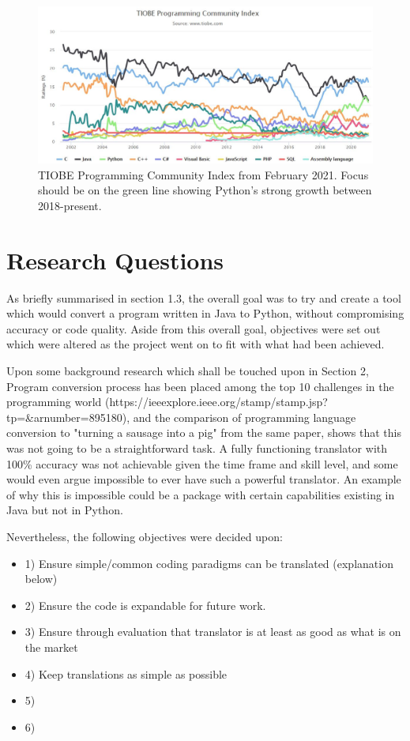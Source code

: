 \documentclass{l4proj}
\begin{document}
\begin{figure}[htb]
    \centering
    \includegraphics[width=1\linewidth]{images/Programming Community Index.JPG}
        \caption{TIOBE Programming Community Index from February 2021. Focus should be on the green line showing Python's strong growth between 2018-present. 
    }
    \label{fig:index} 
\end{figure}

\section{Research Questions}
As briefly summarised in section 1.3, the overall goal was to try and create a tool which would convert a program written in Java to Python, without compromising accuracy or code quality. Aside from this overall goal, objectives were set out which were altered as the project went on to fit with what had been achieved. 

Upon some background research which shall be touched upon in Section 2,  Program conversion process has been placed  among  the  top  10  challenges  in  the  programming  world (https://ieeexplore.ieee.org/stamp/stamp.jsp?tp=&arnumber=895180), and the comparison of programming language conversion to "turning a sausage into a pig" from the same paper, shows that this was not going to be a straightforward task. A fully functioning translator with 100\% accuracy was not achievable given the time frame and skill level, and some would even argue impossible to ever have such a powerful translator. An example of why this is impossible could be a package with certain capabilities existing in Java but not in Python.

Nevertheless, the following objectives were decided upon:
\begin{itemize}
    \item
    1) Ensure simple/common coding paradigms can be translated (explanation below)
    \item
    2) Ensure the code is expandable for future work.
    \item
    3) Ensure through evaluation that translator is at least as good as what is on the market
    \item
    4) Keep translations as simple as possible 
    \item
    5)
    \item
    6)
\end{itemize}
\end{document}
